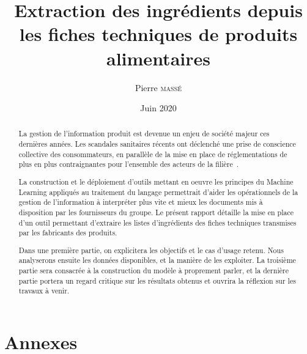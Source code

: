 \documentclass{report}
\title{Extraction des ingrédients depuis les fiches techniques de produits alimentaires}
\author{Pierre \textsc{massé}}
\date{Juin 2020}
\begin{document}
\maketitle

\large
\begin{abstract}   
    
    La gestion de l'information produit est devenue un enjeu de société majeur ces dernières années.
    Les scandales sanitaires récents ont déclenché une prise de conscience collective des consommateurs, en parallèle de la mise en place de réglementations de plus en plus contraignantes pour l'ensemble des acteurs de la filière~\cite{incotext}\cite{incoexpl}.


    La construction et le déploiement d'outils mettant en oeuvre les principes du Machine Learning appliqués au traitement du langage permettrait d'aider les opérationnels de la gestion de l'information à interpréter plus vite et mieux les documents mis à disposition par les fournisseurs du groupe.
    Le présent rapport détaille la mise en place d'un outil permettant d'extraire les listes d'ingrédients des fiches techniques transmises par les fabricants des produits.

    Dans une première partie, on explicitera les objectifs et le cas d'usage retenu.
    Nous analyserons ensuite les données disponibles, et la manière de les exploiter.
    La troisième partie sera consacrée à la construction du modèle à proprement parler, et la dernière partie portera un regard critique sur les résultats obtenus et ouvrira la réflexion sur les travaux à venir.

\end{abstract}
\normalsize

\begin{spacing}{1.0}
\tableofcontents
\end{spacing}









\appendix
\part{Annexes}
\end{document}
